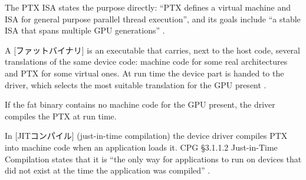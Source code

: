 \documentclass[../main.tex]{subfiles}
\begin{document}
The PTX ISA states the purpose directly: \enquote{PTX defines a virtual
machine and ISA for general purpose parallel thread execution}, and its
goals include \enquote{a stable ISA that spans multiple GPU
generations} \cite[§1.1--1.2]{nvidia2026ptx}.

\begin{definition}
  A [ファットバイナリ] is an executable that carries,
  next to the host code, several translations of the same device code:
  machine code for some real architectures and PTX for some virtual
  ones.  At run time the device part is handed to the driver, which
  selects the most suitable translation for the GPU present
  \cite[§5.6.2]{nvidia2026nvcc}.
\end{definition}

If the fat binary contains no machine code for the GPU present, the
driver compiles the PTX at run time.

\begin{definition}
  In [JITコンパイル] (just-in-time compilation)
  the device driver compiles PTX into machine code when an application
  loads it.  CPG §3.1.1.2 Just-in-Time Compilation states that it is
  \enquote{the only way for applications to run on devices that did not
  exist at the time the application was compiled}
  \cite{nvidia2024cudaguide}.
\end{definition}
\end{document}

